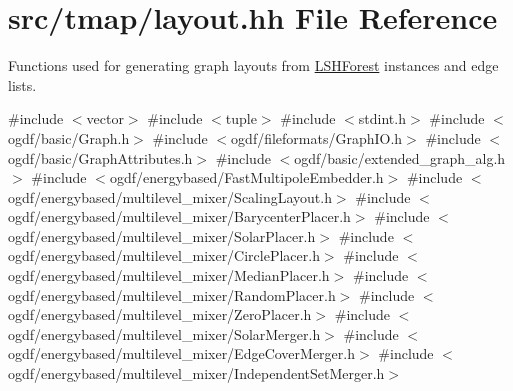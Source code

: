 \hypertarget{layout_8hh}{}\section{src/tmap/layout.hh File Reference}
\label{layout_8hh}


Functions used for generating graph layouts from \hyperlink{classLSHForest}{L\+S\+H\+Forest} instances and edge lists.  


{\ttfamily \#include $<$vector$>$}\newline
{\ttfamily \#include $<$tuple$>$}\newline
{\ttfamily \#include $<$stdint.\+h$>$}\newline
{\ttfamily \#include $<$ogdf/basic/\+Graph.\+h$>$}\newline
{\ttfamily \#include $<$ogdf/fileformats/\+Graph\+I\+O.\+h$>$}\newline
{\ttfamily \#include $<$ogdf/basic/\+Graph\+Attributes.\+h$>$}\newline
{\ttfamily \#include $<$ogdf/basic/extended\+\_\+graph\+\_\+alg.\+h$>$}\newline
{\ttfamily \#include $<$ogdf/energybased/\+Fast\+Multipole\+Embedder.\+h$>$}\newline
{\ttfamily \#include $<$ogdf/energybased/multilevel\+\_\+mixer/\+Scaling\+Layout.\+h$>$}\newline
{\ttfamily \#include $<$ogdf/energybased/multilevel\+\_\+mixer/\+Barycenter\+Placer.\+h$>$}\newline
{\ttfamily \#include $<$ogdf/energybased/multilevel\+\_\+mixer/\+Solar\+Placer.\+h$>$}\newline
{\ttfamily \#include $<$ogdf/energybased/multilevel\+\_\+mixer/\+Circle\+Placer.\+h$>$}\newline
{\ttfamily \#include $<$ogdf/energybased/multilevel\+\_\+mixer/\+Median\+Placer.\+h$>$}\newline
{\ttfamily \#include $<$ogdf/energybased/multilevel\+\_\+mixer/\+Random\+Placer.\+h$>$}\newline
{\ttfamily \#include $<$ogdf/energybased/multilevel\+\_\+mixer/\+Zero\+Placer.\+h$>$}\newline
{\ttfamily \#include $<$ogdf/energybased/multilevel\+\_\+mixer/\+Solar\+Merger.\+h$>$}\newline
{\ttfamily \#include $<$ogdf/energybased/multilevel\+\_\+mixer/\+Edge\+Cover\+Merger.\+h$>$}\newline
{\ttfamily \#include $<$ogdf/energybased/multilevel\+\_\+mixer/\+Independent\+Set\+Merger.\+h$>$}\newline
